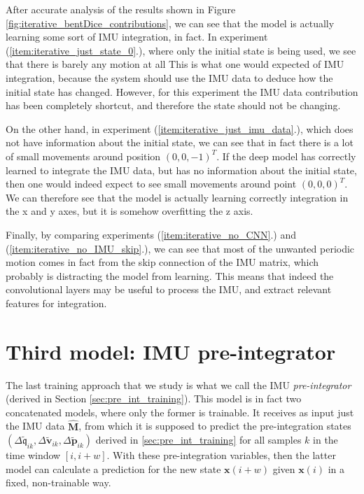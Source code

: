 After accurate analysis of the results shown in Figure \ref{fig:iterative_bentDice_contributions}, we can see that the model is actually learning some sort of IMU integration, in fact. 
In experiment (\ref{item:iterative_just_state_0}.), where only the initial state is being used, we see that there is barely any motion at all
This is what one would expected of IMU integration, because the system should use the IMU data to deduce how the initial state has changed. 
However, for this experiment the IMU data contribution has been completely shortcut, and therefore the state should not be changing. 

On the other hand, in experiment (\ref{item:iterative_just_imu_data}.), which does not have information about the initial state, we can see that in fact there is a lot of small movements around position $(0, 0, -1)^T$.
If the deep model has correctly learned to integrate the IMU data, but has no information about the initial state, then one would indeed expect to see small movements around point $(0, 0, 0)^T$. We can therefore see that the model is actually learning correctly integration in the x and y axes, but it is somehow overfitting the z axis.

Finally, by comparing experiments (\ref{item:iterative_no_CNN}.) and (\ref{item:iterative_no_IMU_skip}.), we can see that most of the unwanted periodic motion comes in fact from the skip connection of the IMU matrix, which probably is distracting the model from learning. 
This means that indeed the convolutional layers may be useful to process the IMU, and extract relevant features for integration. 

\section{Third model: IMU pre-integrator}

The last training approach that we study is what we call the IMU \emph{pre-integrator} (derived in Section \ref{sec:pre_int_training}).
This model is in fact two concatenated models, where only the former is trainable.
It receives as input just the IMU data $\mathbf{\hat{M}}$, from which it is supposed to predict the pre-integration states $(\Delta\mathfrak{\tilde{q}}_{ik}, \Delta\mathbf{\tilde{v}}_{ik}, \Delta\mathbf{\tilde{p}}_{ik})$ derived in \ref{sec:pre_int_training} for all samples $k$ in the time window $[i, i+w]$.
With these pre-integration variables, then the latter model can calculate a prediction for the new state $\mathbf{x}(i+w)$ given $\mathbf{x}(i)$ in a fixed, non-trainable way.


